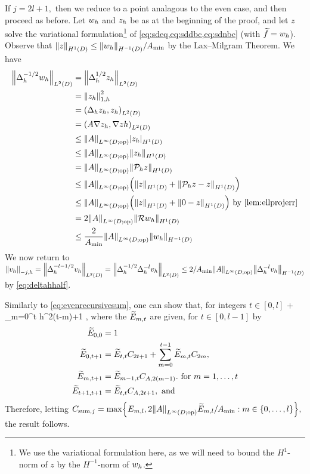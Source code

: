 If $j=2l+1,$ then we reduce to a point analagous to the even case, and then proceed as before. Let $w_{h}$ and $z_{h}$ be as at the beginning of the proof, and let $z$ solve the variational formulation\footnote{We use the variational formulation here, as we will need to bound the $H^1$-norm of $z$ by the $H^{-1}$-norm of $w_{h}$.}  of \cref{eq:sdeq,eq:sddbc,eq:sdnbc} (with $\widetilde{f} = w_{h}$). Observe that $\NHoD{z} \leq \NHmoD{\wh}/\Amin$ by the Lax--Milgram Theorem. We have
\begin{align}
\NLtD{\Deltah^{-1/2}\wh} &= \NLtD{\Deltah^{1/2} \zh}\nonumber\\
&= \Noh{\zh}^2\nonumber\\
&= \IPLtD{\Deltah \zh}{\zh}\\
&= \IPLtD{A \grad \zh}{\grad zh}\nonumber\\
&\leq \NLiDop{A} \SNHoD{\zh}\nonumber\\
&\leq \NLiDop{A} \NHoD{\zh}\nonumber\\
&= \NLiDop{A} \NHoD{\Ph z}\nonumber\\
&\leq \NLiDop{A}\mleft(\NHoD{z} + \NHoD{\Ph z - z}\mright)\nonumber\\
&\leq \NLiDop{A}\mleft(\NHoD{z} + \NHoD{0 - z}\mright) \text{ by \cref{lem:ellprojerr}}\nonumber\\
&= 2\NLiDop{A}\NHoD{\DeltaAI \wh}\nonumber\\
&\leq \frac2{\Amin} \NLiDop{A} \NHmoD{\wh}\label{eq:deltahhalf}
\end{align}
We now return to $\Nmjh{\vh} = \NLtD{\Deltah^{-l-1/2} \vh} = \NLtD{\Deltah^{-1/2} \Deltah^{-l} \vh} \leq 2/\Amin \NLiDop{A} \NHmoD{\Deltah^{-l} \vh}$ by \cref{eq:deltahhalf}.

Similarly to \cref{eq:evenrecursivesum}, one can show that, for integers $t \in [0,l]$
\beqs
{} \leq {}  + \sum_{m=0}^t h^{2(t-m)+1}  ,
\eeqs
where  the $\widetilde{E}_{m,t}$ are given, for $t \in [0,l-1]$ by
\begin{align}
\label{eq:Etilde1}\widetilde{E}_{0,0} &= 1\\
\label{eq:Etilde2}\widetilde{E}_{0,t+1} &= \widetilde{E}_{t,t}C_{2t+1} + \sum_{m=0}^{t-1} \widetilde{E}_{m,t}C_{2m},\\
\label{eq:Etilde3}\widetilde{E}_{m,t+1} &= \widetilde{E}_{m-1,t}C_{A,2(m-1)}.\text{ for } m = 1,\ldots,t\\
\label{eq:Etilde4}\widetilde{E}_{t+1,t+1} &= \widetilde{E}_{t,t}C_{A,2t+1},\text{ and }
\end{align}
Therefore, letting $\Csumj = \max\set{\Efn{m,l},2\NLiDop{A}\Etildefn{m,l}/\Amin \st m \in \set{0,\ldots,l}},$ the result follows.%
\epf

